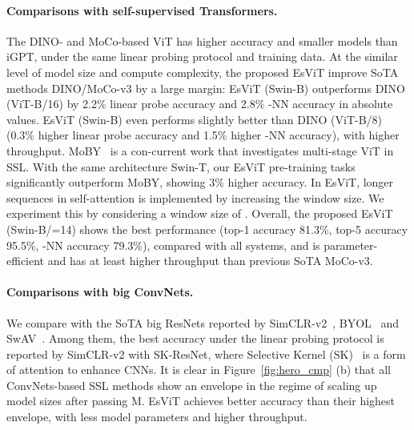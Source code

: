 \documentclass{article} \usepackage{iclr2022_conference,times}
\newcommand{\shortname}{EsViT}
\begin{document}
\paragraph{Comparisons with self-supervised Transformers.} 



The DINO- and MoCo-based ViT has higher accuracy and smaller models than iGPT, under the same linear probing protocol and training data. At the similar level of model size and compute complexity, the proposed \shortname{} improve SoTA methods DINO/MoCo-v3 by a large margin: \shortname{} (Swin-B) outperforms  DINO (ViT-B/16) by 2.2\% linear probe accuracy and 2.8\% -NN accuracy in absolute values.
\shortname{} (Swin-B) even performs slightly better than DINO (ViT-B/8) (0.3\% higher linear probe accuracy and 1.5\% higher -NN accuracy), with  higher throughput.
MoBY~\citep{xie2021moby} is a con-current work that investigates multi-stage ViT in SSL. With the same architecture Swin-T, our \shortname{} pre-training tasks significantly outperform MoBY, showing 3\% higher accuracy. 
In \shortname{}, longer sequences in self-attention is implemented by increasing the window size. We experiment this by considering a window size of . 
Overall, the proposed \shortname{} (Swin-B/=14) shows the best performance (top-1 accuracy 81.3\%, top-5 accuracy 95.5\%, -NN accuracy 79.3\%), compared with all systems, and is  parameter-efficient and has at least  higher throughput than previous SoTA MoCo-v3. 








\paragraph{Comparisons with big ConvNets.}
We compare with the SoTA big ResNets reported by SimCLR-v2~\citep{chen2020big}, BYOL~\citep{grill2020bootstrap} and SwAV~\citep{caron2020unsupervised}. Among them, the best accuracy  under the linear probing protocol is reported by SimCLR-v2 with SK-ResNet, where Selective Kernel (SK)~\citep{li2019selective} is a form of attention to enhance CNNs. 
It is clear in Figure~\ref{fig:hero_cmp} (b) that all ConvNets-based SSL methods show an envelope in the regime of scaling up model sizes after passing M.
\shortname{} achieves better accuracy than their highest envelope, with  less model parameters and  higher throughput.
\end{document}
